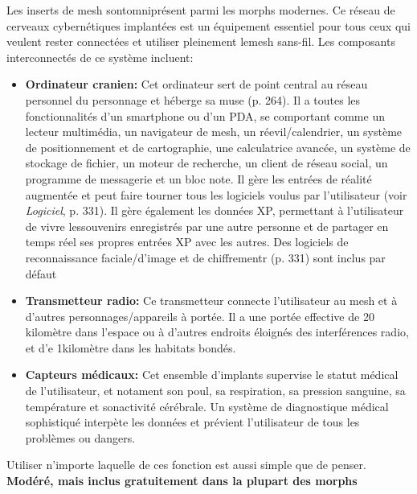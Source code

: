 Les inserts de mesh sontomniprésent parmi les morphs modernes. Ce réseau de cerveaux cybernétiques implantées est un équipement essentiel pour tous ceux qui veulent rester connectées et utiliser pleinement lemesh sans-fil. Les composants interconnectés de ce système incluent: 

\begin{itemize} \item \textbf{Ordinateur cranien:} Cet ordinateur sert de point central au réseau personnel du personnage et héberge sa muse (p. 264). Il a toutes les fonctionnalités d'un smartphone ou d'un PDA, se comportant comme un lecteur multimédia, un navigateur de mesh, un réevil/calendrier, un système de positionnement et de cartographie, une calculatrice avancée, un système de stockage de fichier, un moteur de recherche, un client de réseau social, un programme de messagerie et un bloc note. Il gère les entrées de réalité augmentée et peut faire tourner tous les logiciels voulus par l'utilisateur (voir \emph{Logiciel}, p. 331). Il gère également les données XP, permettant à l'utilisateur de vivre lessouvenirs enregistrés par une autre personne et de partager en temps réel ses propres entrées XP avec les autres. Des logiciels de reconnaissance faciale/d'image et de chiffrementr (p. 331) sont inclus par défaut \item \textbf{Transmetteur radio:} Ce transmetteur connecte l'utilisateur au mesh et à d'autres personnages/appareils à portée. Il a une portée effective de 20 kilomètre dans l'espace ou à d'autres endroits éloignés des interférences radio, et d'e 1kilomètre dans les habitats bondés. \item \textbf{Capteurs médicaux:} Cet ensemble d'implants supervise le statut médical de l'utilisateur, et notament son poul, sa respiration, sa pression sanguine, sa température et sonactivité cérébrale. Un système de diagnostique médical sophistiqué interpète les données et prévient l'utilisateur de tous les problèmes ou dangers. \end{itemize} 

Utiliser n'importe laquelle de ces fonction est aussi simple que de penser. \textbf{{Modéré, mais inclus gratuitement dans la plupart des morphs}} 

